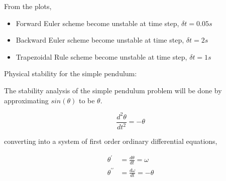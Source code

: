 \documentclass[a4paper,11pt]{report}
\begin{document}
\begin{enumerate}
    \begin{figure}[ht!]
    \centering
    \resizebox{0.9\linewidth}{!}{}
    \end{figure}
    
    \begin{figure}[ht!]
    \centering
    \resizebox{0.9\linewidth}{!}{}
    \end{figure}

    \begin{figure}[ht!]
    \centering
    \resizebox{0.9\linewidth}{!}{}
    \end{figure}

    \begin{figure}[ht!]
    \centering
    \resizebox{0.9\linewidth}{!}{}
    \end{figure}

    \begin{figure}[ht!]
    \centering
    \resizebox{0.9\linewidth}{!}{}
    \end{figure}

    From the plots, 
    \begin{itemize}
    \item Forward Euler scheme become unstable at time step, $\delta t = 0.05s$
    \item Backward Euler scheme become unstable at time step, $\delta t = 2s$
    \item Trapezoidal Rule scheme become unstable at time step, $\delta t = 1s$
    \end{itemize}

    Physical stability for the simple pendulum:
    
    The stability analysis of the simple pendulum problem will be done by 
    approximating $sin(\theta)$ to be $\theta$.

    \begin{equation*}
    \frac{d^2 \theta}{dt^2} = - \theta
    \end{equation*}

    converting into a system of first order ordinary differential equations,

    \begin{equation*}
    \begin{aligned}
    \theta^{\prime} &= \frac{d \theta}{dt} = \omega \\
    \theta^{\prime\prime} &= \frac{d \omega}{dt} = - \theta
    \end{aligned}
    \end{equation*}


\end{enumerate}
\end{document}
